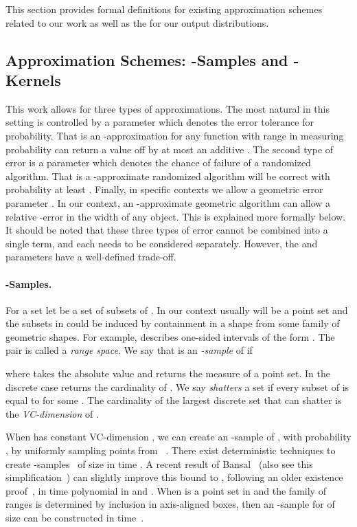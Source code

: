\documentclass{journal}
\begin{document}
This section provides formal definitions for existing approximation schemes related to our work as well as the for our output distributions.  

\subsection{Approximation Schemes: -Samples and -Kernels}

This work allows for three types of approximations.  The most natural in this setting is controlled by a parameter  which denotes the error tolerance for probability.  That is an -approximation for any function with range in  measuring probability can return a value off by at most an additive .  
The second type of error is a parameter  which denotes the chance of failure of a randomized algorithm.  That is a -approximate randomized algorithm will be correct with probability at least .  
Finally, in specific contexts we allow a geometric error parameter .  In our context, an -approximate geometric algorithm can allow a relative -error in the width of any object.  This is explained more formally below.  
It should be noted that these three types of error cannot be combined into a single term, and each needs to be considered separately.  However, the  and  parameters have a well-defined trade-off.  

\paragraph{-Samples.}
For a set  let  be a set of subsets of .  In our context usually  will be a point set and the subsets in  could be induced by containment in a shape from some family of geometric shapes.
For example,  describes one-sided intervals of the form .
The pair  is called a \emph{range space}.  We say that  is an \emph{-sample} of  if

where  takes the absolute value and  returns the measure of a point set.  In the discrete case  returns the cardinality of .  We say  \emph{shatters} a set  if every subset of  is equal to  for some .  The cardinality of the largest discrete set  that  can shatter is the \emph{VC-dimension} of .




When  has constant VC-dimension , we can create an -sample  of , with probability , by uniformly sampling  points from ~\cite{VC71,LLS01}.  There exist deterministic techniques to create -samples~\cite{Mat91,CM96} of size  in time .
A recent result of Bansal~\cite{Ban10} (also see this simplification~\cite{LM12}) can slightly improve this bound to , following an older existence proof~\cite{MWW93}, in time polynomial in  and .  
When  is a point set in  and the family of ranges  is determined by inclusion in axis-aligned boxes, then an -sample for  of size  can be constructed in  time~\cite{Phi08}.
\end{document}
